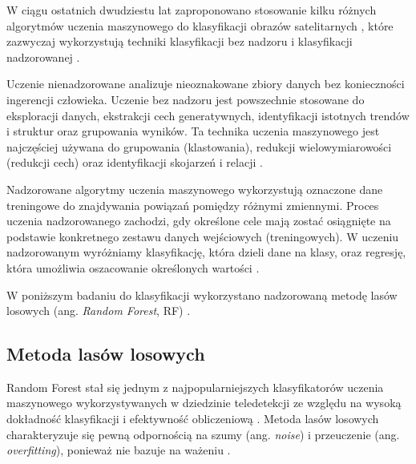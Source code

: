 \documentclass{amuthesis}
\begin{document}
W ciągu ostatnich dwudziestu lat zaproponowano stosowanie kilku różnych
algorytmów uczenia maszynowego do klasyfikacji obrazów satelitarnych
\autocite{sheykhmousa_2020_svm_vs_rf}, które zazwyczaj wykorzystują
techniki klasyfikacji bez nadzoru i klasyfikacji nadzorowanej
\autocite{ismail_2009_classification}.

Uczenie nienadzorowane analizuje nieoznakowane zbiory danych bez
konieczności ingerencji człowieka. Uczenie bez nadzoru jest powszechnie
stosowane do eksploracji danych, ekstrakcji cech generatywnych,
identyfikacji istotnych trendów i struktur oraz grupowania wyników. Ta
technika uczenia maszynowego jest najczęściej używana do grupowania
(klastowania), redukcji wielowymiarowości (redukcji cech) oraz
identyfikacji skojarzeń i relacji \autocite{sarker_2021_ml}.

Nadzorowane algorytmy uczenia maszynowego wykorzystują oznaczone dane
treningowe do znajdywania powiązań pomiędzy różnymi zmiennymi. Proces
uczenia nadzorowanego zachodzi, gdy określone cele mają zostać
osiągnięte na podstawie konkretnego zestawu danych wejściowych
(treningowych). W uczeniu nadzorowanym wyróżniamy klasyfikację, która
dzieli dane na klasy, oraz regresję, która umożliwia oszacowanie
określonych wartości \autocite{sarker_2021_ml}.

W poniższym badaniu do klasyfikacji wykorzystano nadzorowaną metodę
lasów losowych (ang. \emph{Random Forest}, RF)
\autocite{breiman_2001_rf}.

\hypertarget{sec-random-forest}{%
\subsection{Metoda lasów losowych}\label{sec-random-forest}}

Random Forest stał się jednym z najpopularniejszych klasyfikatorów
uczenia maszynowego wykorzystywanych w dziedzinie teledetekcji ze
względu na wysoką dokładność klasyfikacji i efektywność obliczeniową
\autocite{belgiu_2016_rf,sheykhmousa_2020_svm_vs_rf}. Metoda lasów
losowych charakteryzuje się pewną odpornością na szumy (ang.
\emph{noise}) i przeuczenie (ang. \emph{overfitting}), ponieważ nie
bazuje na ważeniu \autocite{gislason_2006_rf}.
\end{document}
